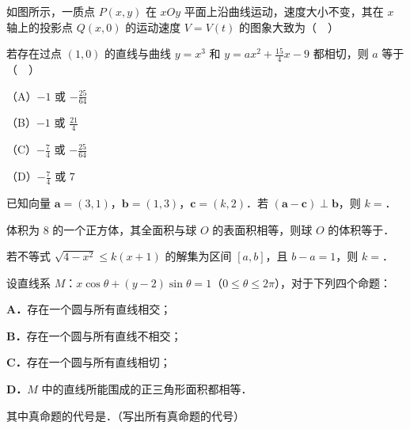 \begingroup
\renewenvironment{question}{\Needspace{0.5\textheight}}{}
\begin{question}
如图所示，一质点 $P(x,y)$ 在 $xOy$ 平面上沿曲线运动，速度大小不变，其在 $x$ 轴上的投影点 $Q(x,0)$ 的运动速度 $V=V(t)$ 的图象大致为（　）
\nopagebreak[4]
\begin{center}\end{center}
\nopagebreak[4]
\end{question}
\endgroup
\begin{question}
若存在过点 $(1,0)$ 的直线与曲线 $y=x^3$ 和 $y=ax^2+\frac{15}{4}x-9$ 都相切，则 $a$ 等于（　）

（A）$-1$ 或 $-\frac{25}{64}$

（B）$-1$ 或 $\frac{21}{4}$

（C）$-\frac74$ 或 $-\frac{25}{64}$

（D）$-\frac74$ 或 $7$

\end{question}

\begin{question}
已知向量 $\boldsymbol a=(3,1)$，$\boldsymbol b=(1,3)$，$\boldsymbol c=(k,2)$．若 $(\boldsymbol a-\boldsymbol c)\perp\boldsymbol b$，则 $k=$\gkblank{}．

\end{question}
\begin{question}
体积为 $8$ 的一个正方体，其全面积与球 $O$ 的表面积相等，则球 $O$ 的体积等于\gkblank{}．

\end{question}
\begin{question}
若不等式 $\sqrt{4-x^2}\leqslant k(x+1)$ 的解集为区间 $[a,b]$，且 $b-a=1$，则 $k=$\gkblank{}．

\end{question}
\begin{question}
设直线系 $M$：$x\cos\theta+(y-2)\sin\theta=1$（$0\leqslant\theta\leqslant2\pi$），对于下列四个命题：

\textbf{A．}存在一个圆与所有直线相交；

\textbf{B．}存在一个圆与所有直线不相交；

\textbf{C．}存在一个圆与所有直线相切；

\textbf{D．}$M$ 中的直线所能围成的正三角形面积都相等．

其中真命题的代号是\gkblank{}．（写出所有真命题的代号）

\end{question}

